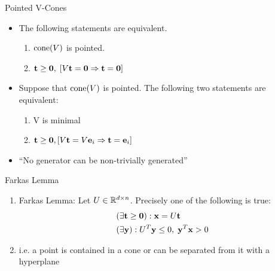 \documentclass{beamer}
\begin{document}
\begin{frame}{Pointed V-Cones}
\begin{itemize}
  \item<1-> The following statements are equivalent.
    \begin{enumerate}
      \item $\operatorname{cone}(V)$ is pointed.
      \item $\mathbf{t}\geq\mathbf{0},\; [V\mathbf{t}=\mathbf{0} \Rightarrow \mathbf{t}=\mathbf{0}]$
    \end{enumerate}
	\item<2-> Suppose that $\operatorname{cone}(V)$ is pointed.  The following two statements are equivalent:
	\begin{enumerate}
		\item V is minimal
		\item $\mathbf{t}\geq\mathbf{0}, [V\mathbf{t} = V\mathbf{e}_i \Rightarrow \mathbf{t}=\mathbf{e}_i]$
	\end{enumerate}
  \item<3-> ``No generator can be non-trivially generated''
\end{itemize}
\end{frame}

\begin{frame}{Farkas Lemma}
\begin{enumerate}
  \item<1-> Farkas Lemma:
    Let $U \in \mathbb{R}^{d\times n}$.  Precisely one of the following is true:
    \begin{align*}
       & (\exists \mathbf{t} \geq \mathbf{0}) : \mathbf{x} = U\mathbf{t}                \\
       & (\exists \mathbf{y}) : U^T\mathbf{y} \leq 0,\; \mathbf{y}^T \mathbf{x} > 0
    \end{align*}
  \item<2-> i.e. a point is contained in a cone or can be separated from it with a hyperplane
\end{enumerate}
\end{frame}
\end{document}
